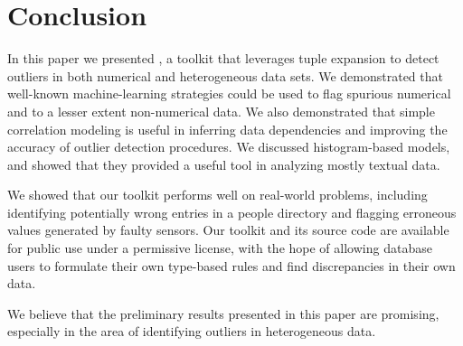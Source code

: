 \section{Conclusion}
\label{sec:conclusion}

In this paper we presented \dBoost, a toolkit that leverages tuple expansion to detect outliers in both numerical and heterogeneous data sets. We demonstrated that well-known machine-learning strategies could be used to flag spurious numerical and to a lesser extent non-numerical data. We also demonstrated that simple correlation modeling is useful in inferring data dependencies and improving the accuracy of outlier detection procedures. We discussed histogram-based models, and showed that they provided a useful tool in analyzing mostly textual data.

We showed that our toolkit performs well on real-world problems, including identifying potentially wrong entries in a people directory and flagging erroneous values generated by faulty sensors. Our toolkit and its source code are available for public use under a permissive license, with the hope of allowing database users to formulate their own type-based rules and find discrepancies in their own data.

We believe that the preliminary results presented in this paper are promising, especially in the area of identifying outliers in heterogeneous data.

